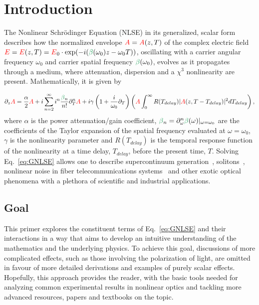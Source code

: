 \chapter{Introduction}
\label{ch:Introduction}
The Nonlinear Schr{\"o}dinger Equation (NLSE) in its generalized, scalar form describes how the normalized envelope $\textcolor{red}{A} =\textcolor{red}{A}(z,T)$ of the complex electric field $\E= \E(z,T) = \E_0\cdot \exp(-i(\betag(\omega_0)z-\omega_0T))$, oscillating with a carrier angular frequency $\omega_0$ and carrier spatial frequency $\betag(\omega_0)$, evolves as it propagates through a medium, where attenuation, dispersion and a $\chi^{3}$ nonlinearity are present. Mathematically, it is given by

\begin{align}
    \label{eq:GNLSE}
    \partial_z \A = \frac{\alpha}{2}\A+i \sum_{n=2}^{\infty}i^n \frac{\betag_n}{n!}\partial_T^n\A  + i\gamma\left(1+\frac{i}{\omega_0}\partial_T  \right)\left( 
\A \int_{0}^{\infty} R(T_{delay})|\A(z,T-T_{delay})|^2 dT_{delay} \right),
\end{align}
where $\alpha$ is the power attenuation/gain coefficient, $\betag_n=\partial_\omega^n\betag(\omega)|_{\omega=\omega_0}$ are the coefficients of the Taylor expansion of the spatial frequency evaluated at $\omega = \omega_0$,  $\gamma$ is the nonlinearity parameter and $R(T_{delay})$ is the temporal response function of the nonlinearity at a time delay, $T_{delay}$, before the present time, $T$. Solving Eq.~\ref{eq:GNLSE} allows one to describe supercontinuum generation~\cite{supercontinuum_original_paper,NLSE_original}, solitons~\cite{soliton_first_theory,Soliton_experimental_first}, nonlinear noise in fiber telecommunications systems~\cite{poggiolini2014detailedanalyticalderivationgn} and other exotic optical phenomena with a plethora of scientific and industrial applications. 

\section{Goal}
This primer explores the constituent terms of Eq.~\ref{eq:GNLSE} and their interactions in a way that aims to develop an intuitive understanding of the mathematics and the underlying physics. To achieve this goal, discussions of more complicated effects, such as those involving the polarization of light, are omitted in favour of more detailed derivations and examples of purely scalar effects. Hopefully, this approach provides the reader, with the basic tools needed for analyzing common experimental results in nonlinear optics and tackling more advanced resources, papers and textbooks on the topic. 

